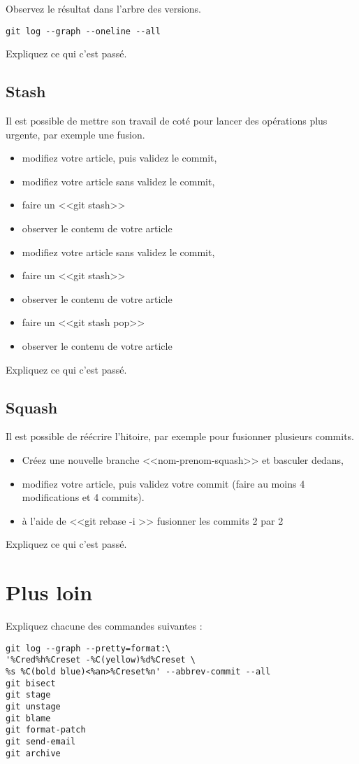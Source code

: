 \documentclass[a4paper]{article}
\begin{document}
Observez le résultat dans l'arbre des versions. 
\begin{verbatim}
git log --graph --oneline --all
\end{verbatim}

Expliquez ce qui c'est passé.

\subsection{Stash}

Il est possible de mettre son travail de coté pour lancer des opérations plus urgente, par exemple une fusion.

\begin{itemize}
  \item modifiez votre article, puis validez le commit,
  \item modifiez votre article sans validez le commit,
  \item faire un <<git stash>>
  \item observer le contenu de votre article
  \item modifiez votre article sans validez le commit,
  \item faire un <<git stash>>
  \item observer le contenu de votre article
  \item faire un <<git stash pop>> 
  \item observer le contenu de votre article
\end{itemize}

Expliquez ce qui c'est passé.

\subsection{Squash}

Il est possible de réécrire l'hitoire, par exemple pour fusionner plusieurs commits.

\begin{itemize}
  \item Créez une nouvelle branche <<nom-prenom-squash>> et basculer dedans,
  \item modifiez votre article, puis validez votre commit (faire au moins 4 modifications et 4 commits). 
  \item à l'aide de <<git rebase -i >> fusionner les commits 2 par 2
\end{itemize}

Expliquez ce qui c'est passé.

\section{Plus loin}

Expliquez chacune des commandes suivantes :
\begin{verbatim}
git log --graph --pretty=format:\
'%Cred%h%Creset -%C(yellow)%d%Creset \
%s %C(bold blue)<%an>%Creset%n' --abbrev-commit --all
git bisect
git stage
git unstage
git blame 
git format-patch
git send-email
git archive
\end{verbatim}
\end{document}
